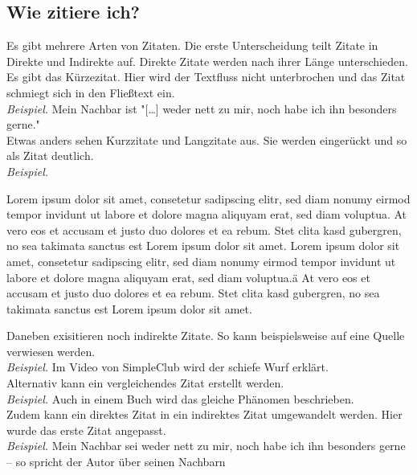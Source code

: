 \subsection{Wie zitiere ich?}
    Es gibt mehrere Arten von Zitaten. Die erste Unterscheidung teilt Zitate in Direkte und Indirekte auf.
    Direkte Zitate werden nach ihrer Länge unterschieden. Es gibt das Kürzezitat. Hier wird der Textfluss nicht unterbrochen und das Zitat schmiegt sich in den Fließtext ein.\\
    \emph{Beispiel.} Mein Nachbar ist "[\dots] weder nett zu mir, noch habe ich ihn besonders gerne." \autocite[][S. 69]{ruprecht}\\
    Etwas anders sehen Kurzzitate und Langzitate aus. Sie werden eingerückt und so als Zitat deutlich.\\
    \emph{Beispiel.}\\
    \begin{displayquote}
        Lorem ipsum dolor sit amet, consetetur sadipscing elitr, sed diam nonumy eirmod tempor invidunt ut labore et dolore magna aliquyam erat, sed diam voluptua.
        At vero eos et accusam et justo duo dolores et ea rebum.
        Stet clita kasd gubergren, no sea takimata sanctus est Lorem ipsum dolor sit amet.
        Lorem ipsum dolor sit amet, consetetur sadipscing elitr, sed diam nonumy eirmod tempor invidunt ut labore et dolore magna aliquyam erat, sed diam voluptua.ä
        At vero eos et accusam et justo duo dolores et ea rebum. Stet clita kasd gubergren, no sea takimata sanctus est Lorem ipsum dolor sit amet. \autocite[S. 11f.]{simpleclub}
    \end{displayquote}
    Daneben exisitieren noch indirekte Zitate. So kann beispielsweise auf eine Quelle verwiesen werden.\\
    \emph{Beispiel.} Im Video von SimpleClub \autocite{simpleclub} wird der schiefe Wurf erklärt.\\
    Alternativ kann ein vergleichendes Zitat erstellt werden.\\
    \emph{Beispiel.} Auch in einem Buch wird das gleiche Phänomen beschrieben. \autocite[vgl.][]{ruprecht}\\
    Zudem kann ein direktes Zitat in ein indirektes Zitat umgewandelt werden. Hier wurde das erste Zitat angepasst.\\
    \emph{Beispiel.} Mein Nachbar sei weder nett zu mir, noch habe ich ihn besonders gerne -- so spricht der Autor über seinen Nachbarn \autocite[vgl.][S. 69]{ruprecht}\\
    \vspace{1cm} 
